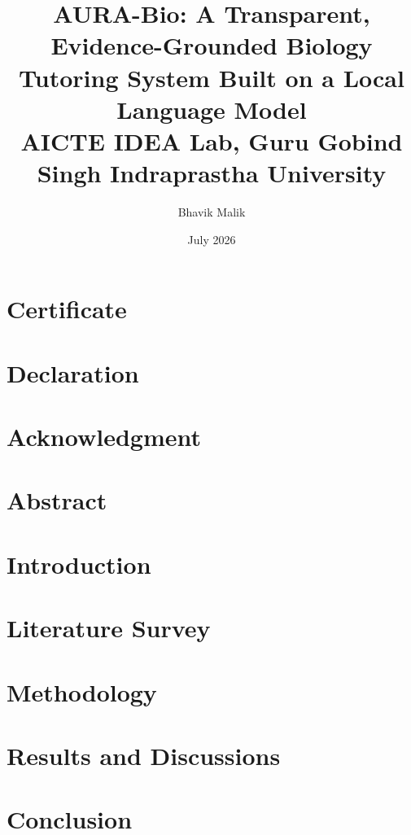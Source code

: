\documentclass[12pt,oneside,table]{report}
\title{
{AURA-Bio: A Transparent, Evidence-Grounded Biology Tutoring System Built on a Local Language Model}\\
{\large AICTE IDEA Lab, Guru Gobind Singh Indraprastha University}
}
\author{Bhavik Malik}
\date{July 2026}
\begin{document}



\clearpage
{}
\pagestyle{plain}  

\chapter*{\centering Certificate}



\clearpage
\chapter*{\centering Declaration}


\chapter*{\centering Acknowledgment}

\chapter*{\centering Abstract}
 
\tableofcontents
\listoftables



\onehalfspacing %



\chapter{Introduction}\label{1}

\chapter{Literature Survey}\label{2}

\chapter{Methodology} \label{3}

\chapter{Results and Discussions} \label{4}

\chapter{Conclusion} \label{5}


\cleardoublepage
{}
{}

%

%
\printbibliography
\end{document}
